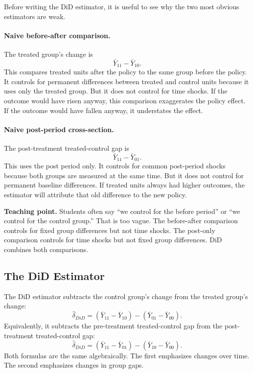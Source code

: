 Before writing the DiD estimator, it is useful to see why the two most obvious
estimators are weak.

\paragraph{Naive before-after comparison.}
The treated group's change is
\[
    \bar{Y}_{11}-\bar{Y}_{10}.
\]
This compares treated units after the policy to the same group before the
policy. It controls for permanent differences between treated and control units
because it uses only the treated group. But it does not control for time shocks.
If the outcome would have risen anyway, this comparison exaggerates the policy
effect. If the outcome would have fallen anyway, it understates the effect.

\paragraph{Naive post-period cross-section.}
The post-treatment treated-control gap is
\[
    \bar{Y}_{11}-\bar{Y}_{01}.
\]
This uses the post period only. It controls for common post-period shocks because
both groups are measured at the same time. But it does not control for permanent
baseline differences. If treated units always had higher outcomes, the estimator
will attribute that old difference to the new policy.

\begin{boxD}
\textbf{Teaching point.} Students often say ``we control for the before period''
or ``we control for the control group.'' That is too vague. The before-after
comparison controls for fixed group differences but not time shocks. The
post-only comparison controls for time shocks but not fixed group differences.
DiD combines both comparisons.
\end{boxD}

\subsection{The DiD Estimator}

The DiD estimator subtracts the control group's change from the treated group's
change:
\[
    \widehat{\delta}_{DiD}
    =
    (\bar{Y}_{11}-\bar{Y}_{10})
    -
    (\bar{Y}_{01}-\bar{Y}_{00}).
\]
Equivalently, it subtracts the pre-treatment treated-control gap from the
post-treatment treated-control gap:
\[
    \widehat{\delta}_{DiD}
    =
    (\bar{Y}_{11}-\bar{Y}_{01})
    -
    (\bar{Y}_{10}-\bar{Y}_{00}).
\]
Both formulas are the same algebraically. The first emphasizes changes over
time. The second emphasizes changes in group gaps.

